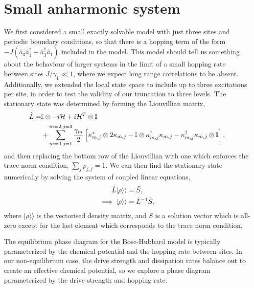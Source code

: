 \section{Small anharmonic system}

We first considered a small exactly solvable model with just three sites and periodic boundary conditions, so that there is a hopping term of the form \(-J(\hat{a}_{3}\hat{a}_{1}^{\dagger} + \hat{a}_{3}^{\dagger}\hat{a}_{1})\) included in the model. This model should tell us something about the behaviour of larger systems in the limit of a small hopping rate between sites \(J / \gamma_{1} \ll 1\), where we expect long range correlations to be absent. Additionally, we extended the local state space to include up to three excitations per site, in order to test the validity of our truncation to three levels. The stationary state was determined by forming the Liouvillian matrix,
\begin{align}
	\hat{L} = &\mathbb{I} \otimes -i\mathcal{H} + i\mathcal{H}^{T} \otimes \mathbb{I} \notag \\
	&+ \sum_{m=0,j=1}^{m=2,j=3}\frac{\gamma_{m}}{2}\left[ \kappa_{m,j}^{*} \otimes 2\kappa_{m,j} - \mathbb{I} \otimes \kappa_{m,j}^{\dagger}\kappa_{m,j} - \kappa_{m,j}^{\dagger}\kappa_{m,j} \otimes \mathbb{I}\right],
	\label{eq:dnlca3-1}
\end{align}
and then replacing the bottom row of the Liouvillian with one which enforces the trace norm condition, \(\sum_{j} \rho_{j,j} = 1\). We can then find the stationary state numerically by solving the system of coupled linear equations,
\begin{align}
	 \hat{L}|\rho \rangle \rangle &= \bar{S}, \notag \\
	 \implies |\rho \rangle \rangle &= \hat{L}^{-1}\bar{S},
	 \label{eq:dnlca3-2}
\end{align}
where \(|\rho\rangle\rangle\) is the vectorised density matrix, and \(\bar{S}\) is a solution vector which is all-zero except for the last element which corresponds to the trace norm condition.

The equilibrium phase diagram for the Bose-Hubbard model is typically parameterized by the chemical potential and the hopping rate between sites. In our non-equilibrium case, the drive strength and dissipation rates balance out to create an effective chemical potential, so we explore a phase diagram parameterized by the drive strength and hopping rate.

